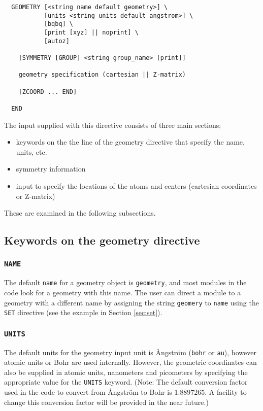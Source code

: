\label{sec:geom}

\begin{verbatim}
  GEOMETRY [<string name default geometry>] \
           [units <string units default angstrom>] \
           [bqbq] \
           [print [xyz] || noprint] \
           [autoz]
    
    [SYMMETRY [GROUP] <string group_name> [print]]

    geometry specification (cartesian || Z-matrix)

    [ZCOORD ... END]

  END
\end{verbatim}

The input supplied with this directive consists of three main
sections;

\begin{itemize}
\item keywords on the the line of the geometry directive that specify
  the name, units, etc.
\item symmetry information
\item input to specify the locations of the atoms and centers
  (cartesian coordinates or Z-matrix)
\end{itemize}

These are examined in the following subsections.

\subsection{Keywords on the geometry directive}
\subsubsection*{{\tt NAME}}
The default \verb+name+ for a geometry object is \verb+geometry+, and
most modules in the code look for a geometry with this name.  The user
can direct a module to a geometry with a different name by assigning
the string \verb+geomery+ to \verb+name+ using the \verb+SET+
directive (see the example in Section \ref{sec:set}).

\subsubsection*{{\tt UNITS}}
The default units for the geometry input unit is {\AA}ngstr\"{o}m
(\verb+bohr+ or \verb+au+), however atomic units or Bohr are used
internally.  However, the geometric coordinates can also be supplied
in atomic units, nanometers and picometers by specifying the
appropriate value for the \verb+UNITS+ keyword.  (Note: The default
conversion factor used in the code to convert from {\AA}ngstr\"{o}m to
Bohr is $1.8897265$.  A facility to change this conversion factor will
be provided in the near future.)

